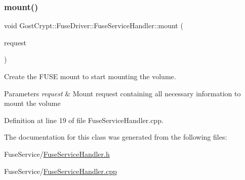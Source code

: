 \subsubsection{\texorpdfstring{mount()}{mount()}}
{\footnotesize\ttfamily void Gost\+Crypt\+::\+Fuse\+Driver\+::\+Fuse\+Service\+Handler\+::mount (\begin{DoxyParamCaption}\item[{Q\+Shared\+Pointer$<$ \hyperlink{struct_gost_crypt_1_1_core_1_1_mount_volume_request}{Core\+::\+Mount\+Volume\+Request} $>$}]{request }\end{DoxyParamCaption})}



Create the F\+U\+SE mount to start mounting the volume. 


\begin{DoxyParams}{Parameters}
{\em request} & Mount request containing all necessary information to mount the volume \\
\hline
\end{DoxyParams}


Definition at line 19 of file Fuse\+Service\+Handler.\+cpp.



The documentation for this class was generated from the following files\+:\begin{DoxyCompactItemize}
\item 
Fuse\+Service/\hyperlink{_fuse_service_handler_8h}{Fuse\+Service\+Handler.\+h}\item 
Fuse\+Service/\hyperlink{_fuse_service_handler_8cpp}{Fuse\+Service\+Handler.\+cpp}\end{DoxyCompactItemize}
